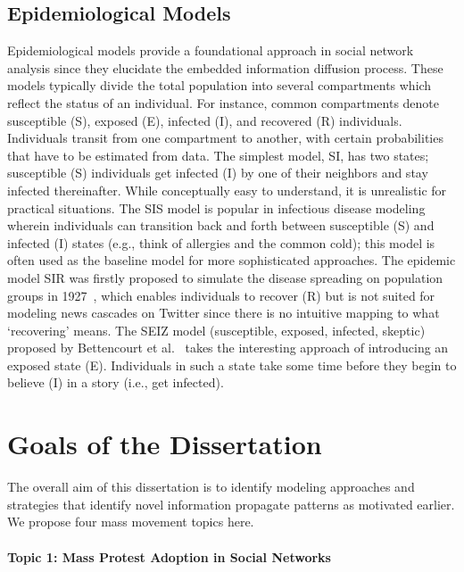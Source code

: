 \subsection{Epidemiological Models}
Epidemiological models provide a foundational approach in social network analysis since they elucidate the embedded information diffusion process.
These models typically divide the total population into several compartments
which reflect the status of an individual. For instance, common compartments
denote susceptible (S), exposed (E), infected (I), and
recovered (R) individuals. Individuals transit from one compartment to another, with
certain probabilities that have to be estimated from data.
The simplest model, SI, has two states; susceptible (S) individuals get infected (I) by one of their neighbors and stay infected thereinafter. While conceptually easy to understand, it is unrealistic for practical situations.
The SIS model is popular in infectious disease modeling wherein individuals can transition back and forth between susceptible (S) and infected (I) states (e.g., think of allergies and
the common cold); this model is often used as the baseline model for more sophisticated approaches.
The epidemic model SIR was firstly proposed to simulate the disease spreading on population groups in 1927~\cite{kermack1927contribution}, which enables individuals to recover (R) but is not suited for modeling news cascades on Twitter since there is no intuitive mapping to what `recovering' means.
The SEIZ model (susceptible, exposed, infected, skeptic) proposed by Bettencourt et al.~\cite{powerofgoodidea:2006} takes the interesting approach of introducing an exposed state (E). Individuals in such a state take some time before they begin to believe (I)
in a story (i.e., get infected).

\section{Goals of the Dissertation}
The overall aim of this dissertation is to identify modeling approaches and strategies that identify
novel information propagate patterns as motivated earlier. We propose
four mass movement topics here.

\paragraph{Topic 1: Mass Protest Adoption in Social Networks}

